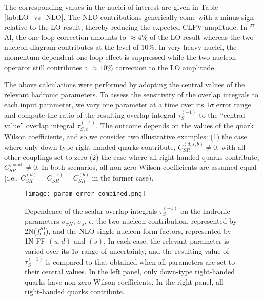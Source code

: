 \documentclass[12pt,letterpaper]{book}
\begin{document}
The corresponding values in the nuclei of interest are given in Table \ref{tab:LO_vs_NLO}. The NLO contributions generically come with a minus sign relative to the LO result, thereby reducing the expected CLFV amplitude. In $^{27}$Al, the one-loop correction amounts to $\approx 4\%$ of the LO result whereas the two-nucleon diagram contributes at the level of $10\%$. In very heavy nuclei, the momentum-dependent one-loop effect is suppressed while the two-nucleon operator still contributes a $\approx 10\%$ correction to the LO amplitude. 

The above calculations were performed by adopting the central values of the relevant hadronic parameters. To assess the sensitivity of the overlap integrals to each input parameter, we vary one parameter at a time over its $1\sigma$ error range and compute the ratio of the resulting overlap integral $\tau_S^{(-1)}$ to the ``central value'' overlap integral $\tau_{S,c}^{(-1)}$. The outcome depends on the values of the quark Wilson coefficients, and so we consider two illustrative examples: (1) the case where only down-type right-handed quarks contribute, $C_{SR}^{(d,s,b)}\neq 0$, with all other couplings set to zero (2) the case where all right-handed quarks contribute, $C_{SR}^{q=\mathrm{all}}\neq 0$. In both scenarios, all non-zero Wilson coefficients are assumed equal (i.e., $C^{(d)}_{SR}=C^{(s)}_{SR}=C^{(b)}_{SR}$ in the former case).
\begin{figure}
\centering
\texttt{[image: param\_error\_combined.png]}
\caption{Dependence of the scalar overlap integrals $\tau_S^{(-1)}$ on the hadronic parameters $\sigma_{\pi N}$, $\sigma_s$, $\epsilon$, the two-nucleon contribution, represented by 2N($f^{SI}_\mathrm{eff}$), and the NLO single-nucleon form factors, represented by 1N FF $(u,d)$ and $(s)$. In each case, the relevant parameter is varied over its $1\sigma$ range of uncertainty, and the resulting value of $\tau_S^{(-1)}$ is compared to that obtained when all parameters are set to their central values. In the left panel, only down-type right-handed quarks have non-zero Wilson coefficients. In the right panel, all right-handed quarks contribute.}
\label{fig:param_uncert}
\end{figure}
\end{document}
